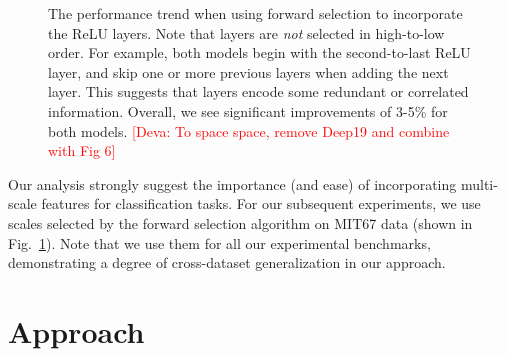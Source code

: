 \documentclass[10pt,twocolumn,letterpaper]{article}
\newcommand{\deva}[1]{\textcolor{red}{[Deva: #1]}}
\begin{document}
\begin{figure}[htbp]
\centering
\caption{The performance trend when using forward selection to incorporate the ReLU layers. Note that layers are {\em not} selected in high-to-low order. For example, both models begin with the second-to-last ReLU layer, and skip one or more previous layers when adding the next layer. This suggests that layers encode some redundant or correlated information. Overall, we see significant improvements of 3-5\% for both models. \deva{To space space, remove Deep19 and combine with Fig 6}}%
\label{fig:forward_select}
\end{figure}


Our analysis strongly suggest the importance (and ease) of incorporating multi-scale features for classification tasks. For our subsequent experiments, we use scales selected by the forward selection algorithm on MIT67 data (shown in Fig.~\ref{fig:forward_select}). Note that we use them for all our experimental benchmarks, demonstrating a degree of cross-dataset generalization in our approach.

\section{Approach\label{sec:approach}} 
\end{document}

